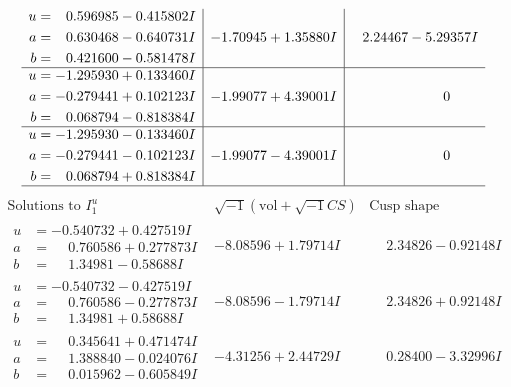 \documentclass[1p]{elsarticle_modified}
\theoremstyle{definition}
\newcommand{\I}{\sqrt{-1}}
\begin{document}
$$\begin{array}{c|c|c}
\begin{aligned}
u &= \phantom{-}0.596985 - 0.415802 I \\
a &= \phantom{-}0.630468 - 0.640731 I \\
b &= \phantom{-}0.421600 - 0.581478 I\end{aligned}
 & -1.70945 + 1.35880 I & \phantom{-}2.24467 - 5.29357 I \\ \hline\begin{aligned}
u &= -1.295930 + 0.133460 I \\
a &= -0.279441 + 0.102123 I \\
b &= \phantom{-}0.068794 - 0.818384 I\end{aligned}
 & -1.99077 + 4.39001 I & \phantom{-0.000000 } 0 \\ \hline\begin{aligned}
u &= -1.295930 - 0.133460 I \\
a &= -0.279441 - 0.102123 I \\
b &= \phantom{-}0.068794 + 0.818384 I\end{aligned}
 & -1.99077 - 4.39001 I & \phantom{-0.000000 } 0\\
 \hline 
 \end{array}$$\newpage$$\begin{array}{c|c|c}  
\text{Solutions to }I^u_{1}& \I (\text{vol} + \sqrt{-1}CS) & \text{Cusp shape}\\
 \hline 
\begin{aligned}
u &= -0.540732 + 0.427519 I \\
a &= \phantom{-}0.760586 + 0.277873 I \\
b &= \phantom{-}1.34981 - 0.58688 I\end{aligned}
 & -8.08596 + 1.79714 I & \phantom{-}2.34826 - 0.92148 I \\ \hline\begin{aligned}
u &= -0.540732 - 0.427519 I \\
a &= \phantom{-}0.760586 - 0.277873 I \\
b &= \phantom{-}1.34981 + 0.58688 I\end{aligned}
 & -8.08596 - 1.79714 I & \phantom{-}2.34826 + 0.92148 I \\ \hline\begin{aligned}
u &= \phantom{-}0.345641 + 0.471474 I \\
a &= \phantom{-}1.388840 - 0.024076 I \\
b &= \phantom{-}0.015962 - 0.605849 I\end{aligned}
 & -4.31256 + 2.44729 I & \phantom{-}0.28400 - 3.32996 I \\ \hline\begin{aligned}

\end{aligned}
\end{array}$$
\end{document}
